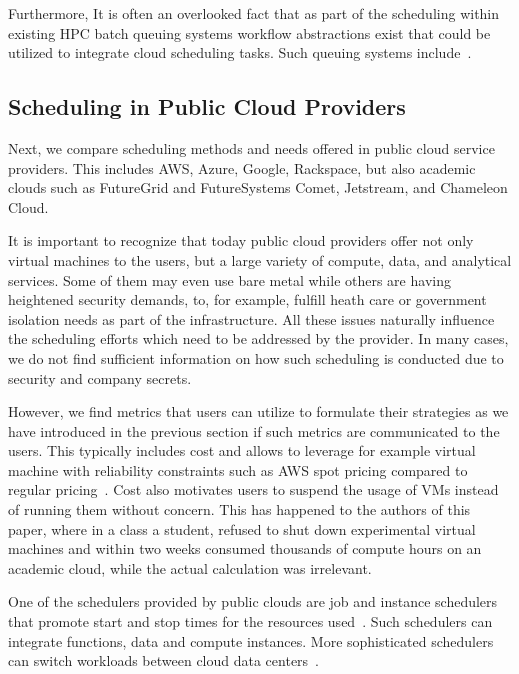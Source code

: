 \documentclass[final,5p,times,twocolumn]{elsarticle}
\begin{document}
Furthermore, It is often an overlooked fact that as part of the scheduling within existing HPC batch queuing systems workflow abstractions exist that could be utilized to integrate cloud scheduling tasks. Such queuing systems include~\cite{www-lsf,www-moab,www-univa-GE-manual,www-pbs-manual}.



\subsection{Scheduling in Public Cloud Providers}
\label{sec:public}

Next, we compare scheduling methods and needs offered in public cloud service providers. This includes AWS, Azure, Google, Rackspace, but also academic clouds such as FutureGrid and FutureSystems Comet, Jetstream, and Chameleon Cloud.

It is important to recognize that today public cloud providers offer not only virtual machines to the users, but a large variety of compute, data, and analytical services. Some of them may even use bare metal while others are having heightened security demands, to, for example, fulfill heath care or government isolation needs as part of the infrastructure. All these issues naturally influence the scheduling efforts which need to be addressed by the provider. In many cases, we do not find sufficient information on how such scheduling is conducted due to security and company secrets.

However, we find metrics that users can utilize to formulate their strategies as we have introduced in the previous section if such metrics are communicated to the users. This typically includes cost and allows to leverage for example virtual machine with reliability constraints such as AWS spot pricing compared to regular pricing~\cite{AmazonEC22015}. Cost also motivates users to suspend the usage of VMs instead of running them without concern. This has happened to the authors of this paper, where in a class a student, refused to shut down experimental virtual machines and within two weeks consumed thousands of compute hours on an academic cloud, while the actual calculation was irrelevant.

One of the schedulers provided by public clouds are job and instance schedulers that promote start and stop times for the resources used~\cite{AWSIns2019,AzureSch2019,Rackspace2016,GoogleAppEngine2018}. Such schedulers can integrate functions, data and compute instances. More sophisticated schedulers can switch workloads between cloud data centers~\cite{MicrosoftAzure2014}.
\end{document}
